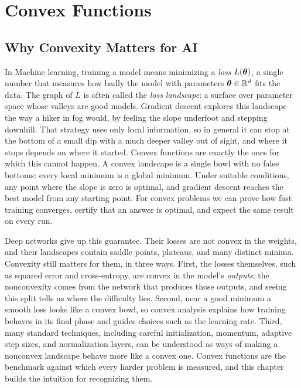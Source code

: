 \chapter{Convex Functions}
\label{chap:ch01}


\section{Why Convexity Matters for AI}
\label{sec:ch01-why}

In Machine learning, training a model means minimizing a \emph{loss} $L(\bm{\theta})$, a
single number that measures how badly the model with parameters
$\bm{\theta} \in \mathbb{R}^d$ fits the data. The graph of $L$ is often called
the \emph{loss landscape}: a surface over parameter space whose valleys
are good models. Gradient descent explores this landscape the way a hiker
in fog would, by feeling the slope underfoot and stepping downhill. That
strategy uses only local information, so in general it can stop at the
bottom of a small dip with a much deeper valley out of sight, and where it
stops depends on where it started. Convex functions are exactly the ones
for which this cannot happen. A convex landscape is a single bowl with no
false bottoms: every local minimum is a global minimum. Under suitable 
conditions, any point where the slope is zero is optimal, and gradient 
descent reaches the best model from any starting point. For convex problems we can prove how fast
training converges, certify that an answer is optimal, and expect the same
result on every run.

Deep networks give up this guarantee. Their losses are not convex in the
weights, and their landscapes contain saddle points, plateaus, and many
distinct minima. Convexity still matters for them, in three ways. First,
the losses themselves, such as squared error and cross-entropy, are convex
in the model's \emph{outputs}; the nonconvexity comes from the network that
produces those outputs, and seeing this split tells us where the
difficulty lies. Second, near a good minimum a smooth loss looks like a
convex bowl, so convex analysis explains how training behaves in its final
phase and guides choices such as the learning rate. Third, many standard
techniques, including careful initialization, momentum, adaptive step
sizes, and normalization layers, can be understood as ways of making a
nonconvex landscape behave more like a convex one. Convex functions are
the benchmark against which every harder problem is measured, and this
chapter builds the intuition for recognizing them.

